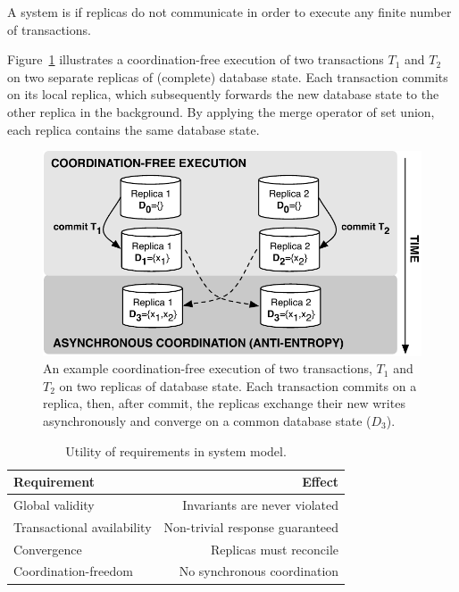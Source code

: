 \begin{definition}
A system is \textit{\cfree} if replicas do not communicate in order to
execute any finite number of transactions.
\end{definition}

Figure~\ref{fig:replicas} illustrates a coordination-free execution of
two transactions $T_1$ and $T_2$ on two separate replicas of
(complete) database state. Each transaction commits on its local
replica, which subsequently forwards the new database state to the
other replica in the background. By applying the merge operator of set
union, each replica contains the same database state.

\begin{figure}
\begin{center}
\includegraphics[width=.85\columnwidth]{figs/replicas.pdf}
\end{center}\vspace{-1em}
\caption{An example coordination-free execution of two transactions,
  $T_1$ and $T_2$ on two replicas of database state. Each transaction
  commits on a replica, then, after commit, the replicas exchange
  their new writes asynchronously and converge on a common database
  state ($D_3$).}
\label{fig:replicas}
\end{figure}


\begin{table}
\begin{center}
\small
\begin{tabular}{|l|r|}
\hline\textbf{Requirement} & \textbf{Effect}  \\\hline
Global validity & Invariants are never violated \\
Transactional availability & Non-trivial response guaranteed \\
Convergence & Replicas must reconcile \\
Coordination-freedom & No synchronous coordination\\\hline
\end{tabular}
\end{center}\vspace{-1em}
\caption{Utility of requirements in system model.}
\label{table:requirements}
\end{table}


